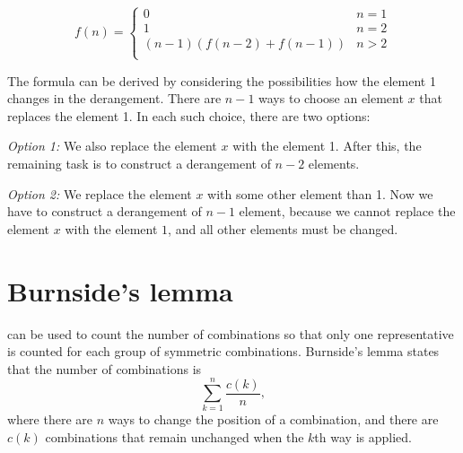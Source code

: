\begin{equation*}
    f(n) = \begin{cases}
               0               & n = 1\\
               1               & n = 2\\
               (n-1)(f(n-2) + f(n-1)) & n>2 \\
           \end{cases}
\end{equation*}

The formula can be derived by considering
the possibilities how the element 1 changes
in the derangement.
There are $n-1$ ways to choose an element $x$
that replaces the element 1.
In each such choice, there are two options:

\textit{Option 1:} We also replace the element $x$
with the element 1.
After this, the remaining task is to construct
a derangement of $n-2$ elements.

\textit{Option 2:} We replace the element $x$
with some other element than 1.
Now we have to construct a derangement
of $n-1$ element, because we cannot replace
the element $x$ with the element $1$, and all other
elements must be changed.

\section{Burnside's lemma}


can be used to count
the number of combinations so that
only one representative is counted
for each group of symmetric combinations.
Burnside's lemma states that the number of
combinations is
\[\sum_{k=1}^n \frac{c(k)}{n},\]
where there are $n$ ways to change the
position of a combination,
and there are $c(k)$ combinations that
remain unchanged when the $k$th way is applied.


